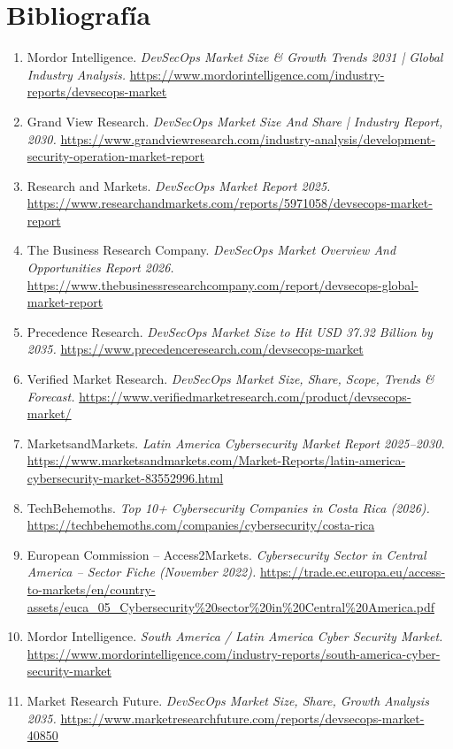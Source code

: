 \section{Bibliografía}

\begin{enumerate}
  \item Mordor Intelligence. \emph{DevSecOps Market Size \& Growth Trends 2031 |
        Global Industry Analysis.}
        \url{https://www.mordorintelligence.com/industry-reports/devsecops-market}
  \item Grand View Research. \emph{DevSecOps Market Size And Share | Industry Report,
        2030.}
        \url{https://www.grandviewresearch.com/industry-analysis/development-security-operation-market-report}
  \item Research and Markets. \emph{DevSecOps Market Report 2025.}
        \url{https://www.researchandmarkets.com/reports/5971058/devsecops-market-report}
  \item The Business Research Company. \emph{DevSecOps Market Overview And Opportunities
        Report 2026.}
        \url{https://www.thebusinessresearchcompany.com/report/devsecops-global-market-report}
  \item Precedence Research. \emph{DevSecOps Market Size to Hit USD 37.32 Billion by
        2035.}
        \url{https://www.precedenceresearch.com/devsecops-market}
  \item Verified Market Research. \emph{DevSecOps Market Size, Share, Scope, Trends \&
        Forecast.}
        \url{https://www.verifiedmarketresearch.com/product/devsecops-market/}
  \item MarketsandMarkets. \emph{Latin America Cybersecurity Market Report 2025--2030.}
        \url{https://www.marketsandmarkets.com/Market-Reports/latin-america-cybersecurity-market-83552996.html}
  \item TechBehemoths. \emph{Top 10+ Cybersecurity Companies in Costa Rica (2026).}
        \url{https://techbehemoths.com/companies/cybersecurity/costa-rica}
  \item European Commission -- Access2Markets. \emph{Cybersecurity Sector in Central
        America -- Sector Fiche (November 2022).}
        \url{https://trade.ec.europa.eu/access-to-markets/en/country-assets/euca_05_Cybersecurity\%20sector\%20in\%20Central\%20America.pdf}
  \item Mordor Intelligence. \emph{South America / Latin America Cyber Security Market.}
        \url{https://www.mordorintelligence.com/industry-reports/south-america-cyber-security-market}
  \item Market Research Future. \emph{DevSecOps Market Size, Share, Growth Analysis
        2035.}
        \url{https://www.marketresearchfuture.com/reports/devsecops-market-40850}
\end{enumerate}
 
